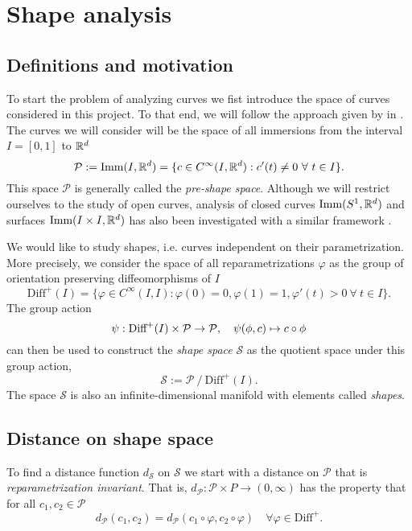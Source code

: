 \section{Shape analysis}\label{sec:shape-analysis}
\subsection{Definitions and motivation}
To start the problem of analyzing curves we fist introduce the space of curves considered in this project. To that end, we will follow the approach given by \citeauthor{bauer2015why} in \cite{bauer2015why}. The curves we will consider will be the space of all immersions from the interval  \(I = [0, 1]\) to  \(\mathbb{R}^d\)
\begin{equation*}
  \mathcal{P}:= \text{Imm}(I, \mathbb{R}^d) = \{c \in C^{\infty}(I, \mathbb{R}^d) :  c'(t) \neq  0 \ \forall \ t \in I  \}.
\end{equation*}
This space \(\mathcal{P}\) is generally called the \emph{pre-shape space}. Although we will restrict ourselves to the study of open curves, analysis of closed curves \(\text{Imm}(S^1, \mathbb{R}^d)\) and surfaces \(\text{Imm}(I \times I, \mathbb{R}^d)\) has also been investigated with a similar framework \cite{bauer2014overview}.

We would like to study shapes, i.e. curves independent on their parametrization. More precisely, we consider the space of all reparametrizations \(\varphi\) as the group of orientation preserving diffeomorphisms of \(I\)
\begin{equation*}
  \text{Diff}^+(I) = \{\varphi \in C^{\infty}(I,I): \varphi(0) = 0, \varphi(1) = 1, \varphi'(t) > 0 \ \forall \ t \in I \}.
\end{equation*}
The group action 
\begin{equation}
  \psi : \text{Diff}^+(I) \times \mathcal{P} \rightarrow \mathcal{P},\quad \psi(\phi, c) \mapsto c \circ \phi 
\end{equation}
can then be used to construct the \emph{shape space} \(\mathcal{S}\) as the quotient space under this group action,
\begin{equation*}
  \mathcal{S} := \mathcal{P} \ / \ {\text{Diff}^+(I)}.
\end{equation*}
The space \(\mathcal{S}\) is also an infinite-dimensional manifold with elements called \emph{shapes}.

\subsection{Distance on shape space}
To find a distance function \(d_{\mathcal{S}}\) on \(\mathcal{S}\) we start with a distance on \(\mathcal{\mathcal{P}}\) that is \emph{reparametrization invariant}. That is, \(d_\mathcal{P} : \mathcal{P} \times P \rightarrow (0, \infty)\) has the property that for all  \(c_1, c_2 \in \mathcal{P}\)
\begin{equation*}
  d_{\mathcal{P}}(c_1, c_2)=d_{\mathcal{P}}(c_1 \circ \varphi, c_2\circ \varphi) \quad \forall \varphi \in \text{Diff}^+.
\end{equation*}

